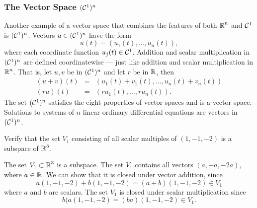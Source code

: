 \documentclass{ximera}
\begin{document}
\subsubsection*{The Vector Space $({\cal C}^1)^n$}

Another example of a vector space that combines the features of
both $\mbox{$\Bbb{R}$}^n$ and ${\cal C}^1$ is $({\cal C}^1)^n$.  Vectors
$u\in ({\cal C}^1)^n$ have the form
\[
u(t) = (u_1(t),\ldots,u_n(t)),
\]
where each coordinate function $u_j(t)\in{\cal C}^1$.  Addition and
scalar multiplication in $({\cal C}^1)^n$ are defined coordinatewise
--- just like addition and scalar multiplication in $\mbox{$\Bbb{R}$}^n$.
That is, let $u,v$ be in $({\cal C}^1)^n$ and let $r$ be in $\mbox{$\Bbb{R}$}$, then
\begin{eqnarray*}
(u+v)(t) & = & (u_1(t)+v_1(t),\ldots,u_n(t)+v_n(t)) \\
(ru)(t) & = & (ru_1(t),\ldots,ru_n(t)).
\end{eqnarray*}
The set $({\cal C}^1)^n$ satisfies the eight properties of vector spaces and
is a vector space.  Solutions to systems of $n$ linear ordinary differential
equations are vectors in $({\cal C}^1)^n$.


\EXER

\TEXER

\begin{exercise} \label{c5.1.1}
Verify that the set $V_1$ consisting of all scalar multiples of
$(1,-1,-2)$ is a subspace of $\mbox{$\Bbb{R}$}^3$.

\begin{solution}

The set $V_1 \subset \mbox{$\Bbb{R}$}^3$ is a subspace.
The set $V_1$ contains all vectors $(a,-a,-2a)$,
where $a \in \mbox{$\Bbb{R}$}$.  We can show that it is closed under
vector addition, since
\[
a(1,-1,-2) + b(1,-1,-2) = (a + b)(1,-1,-2) \in V_1
\]
where $a$ and $b$ are scalars.  The set $V_1$ is closed under scalar
multiplication since
\[
b(a(1,-1,-2) = (ba)(1,-1,-2) \in V_1.
\]

\end{solution}
\end{exercise}
\end{document}
